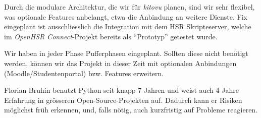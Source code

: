 \documentclass[a4paper]{article}
\begin{document}
Durch die modulare Architektur, die wir für \emph{kitovu} planen, sind wir sehr flexibel, was optionale Features anbelangt, etwa die Anbindung an weitere Dienste. Fix eingeplant ist ausschliesslich die Integration mit dem HSR Skripteserver, welche im \emph{OpenHSR Connect}-Projekt bereits als ``Prototyp'' getestet wurde.

Wir haben in jeder Phase Pufferphasen eingeplant. Sollten diese nicht benötigt werden, können wir das Projekt in dieser Zeit mit optionalen Anbindungen (Moodle/Studentenportal) bzw. Features erweitern.

Florian Bruhin benutzt Python seit knapp 7 Jahren und weist auch 4 Jahre
Erfahrung in grösseren Open-Source-Projekten auf. Dadurch kann er Risiken möglichst früh erkennen, und, falls nötig, auch kurzfristig auf Probleme reagieren.
\end{document}
